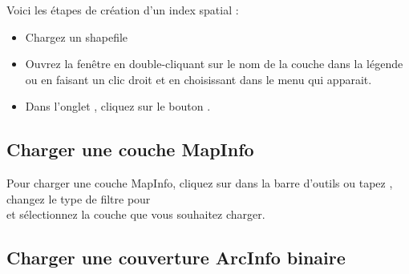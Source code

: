 Voici les étapes de création d'un index spatial :

\begin{itemize}[label=--]
\item Chargez un shapefile
\item Ouvrez la fenêtre  en double-cliquant sur le nom de la couche dans la légende ou en faisant un clic droit et en choisissant  dans le menu qui apparait.
\item Dans l'onglet , cliquez sur le bouton .
\end{itemize}

\subsection{Charger une couche MapInfo}

Pour charger une couche MapInfo, cliquez sur  dans la barre d'outils ou tapez , changez le type de filtre pour\\  et sélectionnez la couche que vous souhaitez charger.

\subsection{Charger une couverture ArcInfo binaire}

